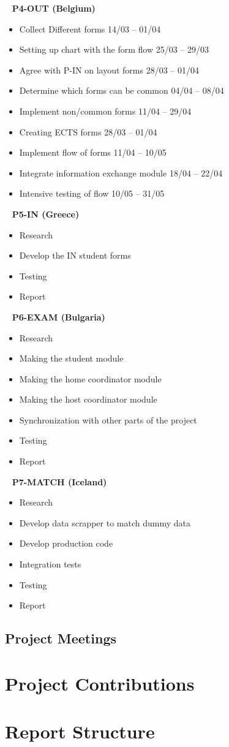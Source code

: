 \ \newline
\textbf{P4-OUT (Belgium)} 
\begin{itemize}
\item Collect Different forms	\hfill14/03 – 01/04
\item Setting up chart with the form flow	\hfill25/03 – 29/03
\item Agree with P-IN on layout forms		\hfill28/03 – 01/04
\item Determine which forms can be common		\hfill04/04 – 08/04
\item Implement non/common forms		\hfill11/04 – 29/04
\item Creating ECTS forms		\hfill28/03 – 01/04
\item Implement flow of forms		\hfill11/04 – 10/05
\item Integrate information  exchange module		\hfill18/04 – 22/04
\item Intensive testing of flow		\hfill10/05 – 31/05
\end{itemize}


\ \newline
\textbf{P5-IN (Greece)} 
\begin{itemize}
\item Research 
\item Develop the IN student forms
\item Testing
\item Report
\end{itemize}

\ \newline
\textbf{P6-EXAM (Bulgaria)} 
\begin{itemize}
\item Research
\item Making the student module
\item Making the home coordinator module
\item Making the host coordinator module
\item Synchronization with other parts of the project
\item Testing
\item Report
\end{itemize}

\ \newline
\textbf{P7-MATCH (Iceland)} 
\begin{itemize}
\item Research
\item Develop data scrapper to match dummy data
\item Develop production code
\item Integration tests
\item Testing
\item Report
\end{itemize}

\subsection{Project Meetings}

\section{Project Contributions}

\section{Report Structure}